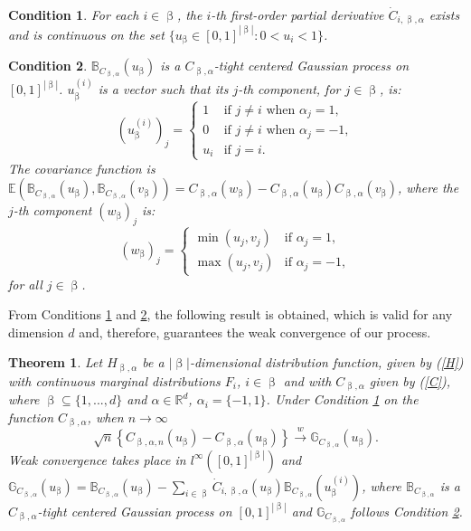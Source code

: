 \documentclass[11pt,a4paper]{article}
\newtheorem{theorem}{Theorem}
\newtheorem{condition}{Condition}
\begin{document}
\begin{condition}\label{con1}
    For each $i\in\upbeta$, the $i$-th first-order partial derivative $\dot{C}_{i,\upbeta,\alpha}$ exists and is continuous on the set $\{u_\upbeta\in[0,1]^{|\upbeta|}:0<u_i<1\}$.
\end{condition}

\begin{condition}\label{con2}
$\mathbb{B}_{C_{\upbeta,\alpha}}(u_\upbeta)$ is a $C_{\upbeta,\alpha}$-tight centered Gaussian process on $[0,1]^{|\upbeta|}$. $u_{\upbeta}^{(i)}$ is a vector such that its $j$-th component, for $j \in \upbeta$, is:
$$(u_{\upbeta}^{(i)})_j=\begin{cases}
1 & \text{if } j \neq i \text{ when } \alpha_j = 1, \\
0 & \text{if } j \neq i \text{ when } \alpha_j = -1, \\
u_i & \text{if } j = i.
\end{cases}$$
The covariance function is $\mathbb{E}(\mathbb{B}_{C_{\upbeta,\alpha}}(u_\upbeta),\mathbb{B}_{C_{\upbeta,\alpha}}(v_\upbeta))=C_{\upbeta,\alpha}(w_\upbeta)-C_{\upbeta,\alpha}(u_\upbeta)C_{\upbeta,\alpha}(v_\upbeta)$, where the $j$-th component $(w_\upbeta)_j$ is:
$$(w_\upbeta)_j=\begin{cases}
\min(u_j,v_j) & \text{if } \alpha_j = 1, \\
\max(u_j,v_j) & \text{if } \alpha_j = -1,
\end{cases}$$
for all $j \in \upbeta$.
\end{condition}

From Conditions \ref{con1} and \ref{con2}, the following result is obtained, which is valid for any dimension $d$ and, therefore, guarantees the weak convergence of our process.


\begin{theorem}\label{th:proc}
    Let $H_{\upbeta,\alpha}$ be a $|\upbeta|$-dimensional distribution function, given by (\ref{H}) with continuous marginal distributions $F_i$, $i\in\upbeta$ and with $C_{\upbeta,\alpha}$ given by (\ref{C}), where $\upbeta\subseteq\{1,...,d\}$ and $\alpha\in\mathbb{R}^d$, $\alpha_i=\{-1,1\}$. Under Condition \ref{con1} on the function $C_{\upbeta,\alpha}$, when $n\longrightarrow\infty$
    $$\sqrt{n}\left\{C_{\upbeta,\alpha,n}(u_\upbeta)-C_{\upbeta,\alpha}(u_\upbeta)\right\}\xrightarrow[]{w}\mathbb{G}_{C_{\upbeta,\alpha}}(u_\upbeta).$$
    Weak convergence takes place in $l^\infty([0,1]^{|\upbeta|})$ and $\mathbb{G}_{C_{\upbeta,\alpha}}(u_\upbeta)=\mathbb{B}_{C_{\upbeta,\alpha}}(u_\upbeta)-\sum_{i\in\upbeta}\dot{C}_{i,\upbeta,\alpha}(u_\upbeta)\mathbb{B}_{C_{\upbeta,\alpha}}(u_\upbeta^{(i)})$, where $\mathbb{B}_{C_{\upbeta,\alpha}}$ is a $C_{\upbeta,\alpha}$-tight centered Gaussian process on $[0,1]^{|\upbeta|}$ and $\mathbb{G}_{C_{\upbeta,\alpha}}$ follows Condition \ref{con2}.
\end{theorem}
\end{document}
